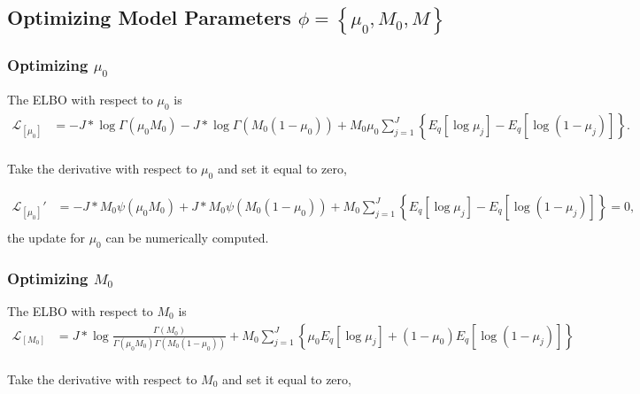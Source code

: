 \documentclass[11pt,reqno]{amsart}
\begin{document}
\subsection{Optimizing Model Parameters $ \phi = \left\lbrace \mu_0, M_0, M \right\rbrace  $}

\subsubsection{Optimizing $ \mu_0 $}
The ELBO with respect to $ \mu_0 $ is
\begin{equation}
\begin{split}
\label{mu_0}
\mathcal{L}_{[\mu_0]} 
&= -J*\log  \Gamma(\mu_0 M_0) - J*\log \Gamma(M_0 (1-\mu_0)) 
+ M_0\mu_0\sum_{j=1}^{J} \left\lbrace E_q  \left[ \log \mu_j \right] 
- E_q  \left[ \log (1 - \mu_j)\right]\right\rbrace . \\
\end{split}
\end{equation}

Take the derivative with respect to $ \mu_0 $ and set it equal to zero,

\begin{equation}
\begin{split}
\label{mu_0}
\mathcal{L}_{[\mu_0]}' 
&= -J*M_0 \psi(\mu_0 M_0) + J*M_0 \psi(M_0 (1-\mu_0)) 
+ M_0\sum_{j=1}^{J} \left\lbrace E_q  \left[ \log \mu_j \right] 
- E_q  \left[ \log (1 - \mu_j)\right]\right\rbrace =0 , \\
\end{split}
\end{equation}
the update for $ \mu_0 $ can be numerically computed.

\subsubsection{Optimizing $ M_0 $}
The ELBO with respect to $ M_0 $ is
\begin{equation}
\begin{split}
\label{M_0}
\mathcal{L}_{[M_0]} 
&=J* \log \frac{ \Gamma(M_0) } { \Gamma(\mu_0 M_0) \Gamma(M_0 (1-\mu_0))}  
+ M_0 \sum_{j=1}^{J} \left\lbrace \mu_0E_q  \left[ \log \mu_j \right] + ( 1 - \mu_0) E_q  \left[ \log (1 - \mu_j)\right]\right\rbrace  \\
\end{split}
\end{equation}

Take the derivative with respect to $ M_0 $ and set it equal to zero,
\end{document}

